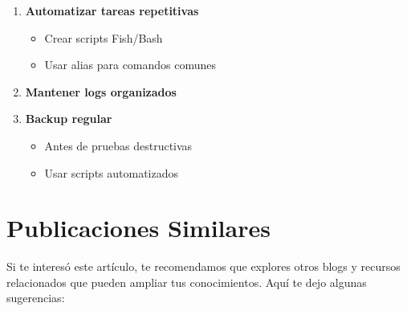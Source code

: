 \documentclass[
  doc,
  floatsintext,
  longtable,
  a4paper,
  nolmodern,
  notxfonts,
  notimes,
  12pt,
  colorlinks=true,linkcolor=blue,citecolor=blue,urlcolor=blue]{apa7}
\newenvironment{Shaded}{\begin{snugshade}}{\end{snugshade}}
\newcommand{\ExtensionTok}[1]{\textcolor[rgb]{0.00,0.23,0.31}{#1}}
\newcommand{\FunctionTok}[1]{\textcolor[rgb]{0.28,0.35,0.67}{#1}}
\newcommand{\NormalTok}[1]{\textcolor[rgb]{0.00,0.23,0.31}{#1}}
\newcommand{\OperatorTok}[1]{\textcolor[rgb]{0.37,0.37,0.37}{#1}}
\newcommand{\VariableTok}[1]{\textcolor[rgb]{0.07,0.07,0.07}{#1}}
\providecommand{\tightlist}{%
  \setlength{\itemsep}{0pt}\setlength{\parskip}{0pt}}
\begin{document}
\begin{enumerate}
\def\labelenumi{\arabic{enumi}.}
\item
  \textbf{Automatizar tareas repetitivas}

  \begin{itemize}
  \tightlist
  \item
    Crear scripts Fish/Bash
  \item
    Usar alias para comandos comunes
  \end{itemize}
\item
  \textbf{Mantener logs organizados}

\begin{Shaded}
\end{Shaded}
\item
  \textbf{Backup regular}

  \begin{itemize}
  \tightlist
  \item
    Antes de pruebas destructivas
  \item
    Usar scripts automatizados
  \end{itemize}
\end{enumerate}

\section{Publicaciones Similares}\label{publicaciones-similares}

Si te interesó este artículo, te recomendamos que explores otros blogs y
recursos relacionados que pueden ampliar tus conocimientos. Aquí te dejo
algunas sugerencias:
\end{document}
